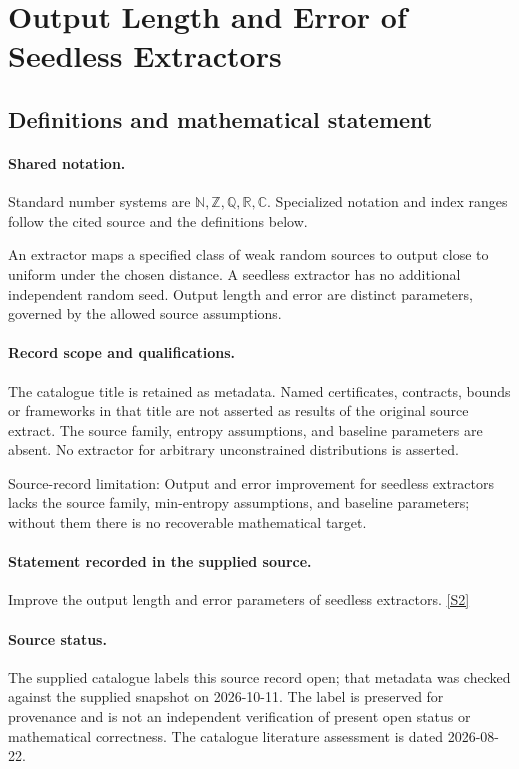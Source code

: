 \documentclass[11pt]{article}
\newcommand{\sref}[2]{\hyperlink{source:#1:#2}{[S#2]}}
\begin{document}
\section{Output Length and Error of Seedless Extractors}\label{statement}

\subsection{Definitions and mathematical statement}

\paragraph{Shared notation.}Standard number systems are $\mathbb N,\mathbb Z,\mathbb Q,\mathbb R,\mathbb C$. Specialized notation and index ranges follow the cited source and the definitions below.


An extractor maps a specified class of weak random sources to output close to uniform under the chosen distance. A seedless extractor has no additional independent random seed. Output length and error are distinct parameters, governed by the allowed source assumptions.
\paragraph{Record scope and qualifications.}
The catalogue title is retained as metadata. Named certificates, contracts, bounds or frameworks in that title are not asserted as results of the original source extract.
The source family, entropy assumptions, and baseline parameters are absent. No extractor for arbitrary unconstrained distributions is asserted.

Source-record limitation: Output and error improvement for seedless extractors lacks the source family, min-entropy assumptions, and baseline parameters; without them there is no recoverable mathematical target.
\paragraph{Statement recorded in the supplied source.}
Improve the output length and error parameters of seedless extractors. \sref{statement}{2}
\paragraph{Source status.}
The supplied catalogue labels this source record open; that metadata was checked against the supplied snapshot on 2026-10-11. The label is preserved for provenance and is not an independent verification of present open status or mathematical correctness. The catalogue literature assessment is dated 2026-08-22.
\end{document}

